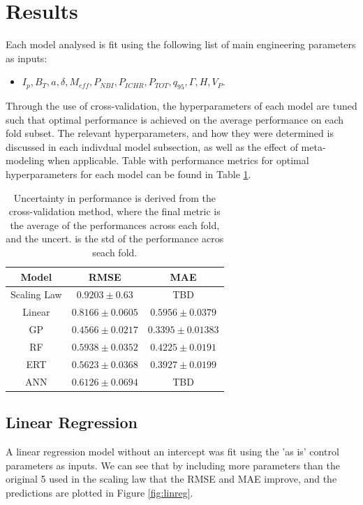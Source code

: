 \documentclass[a4paper, twoside, final, 12pt]{article}
\begin{document}
\section{Results}{\label{sec:results_1}
Each model analysed is fit using the following list of main engineering parameters as inputs:
\begin{itemize}
        \item $I_p, B_T, a, \delta, M_{eff}, P_{NBI}, P_{ICHR}, P_{TOT}, q_{95}, \Gamma, H, V_P$.
\end{itemize}
Through the use of cross-validation, the hyperparameters of each model are tuned such that optimal performance is achieved on the average performance on each fold subset.
The relevant hyperparameters, and how they were determined is discussed in each indivdual model subsection, as well as the effect of meta-modeling when applicable.
Table with performance metrics for optimal hyperparameters for each model can be found in Table \ref{tab:performance_models}.

\begin{table}
	\begin{center}
		\begin{tabular}{| c | c | c |}
		\hline
		Model & RMSE & MAE \\
		\hline
		Scaling Law & $0.9203 \pm 0.63$ & TBD \\
		\hline
		Linear & $0.8166 \pm 0.0605 $ & $0.5956 \pm 0.0379$ \\
		GP & $0.4566 \pm  0.0217$ &  $0.3395 \pm 0.01383$\\
		RF & $0.5938 \pm 0.0352$ & $0.4225 \pm 0.0191$ \\
		ERT &$0.5623 \pm 0.0368 $ & $0.3927 \pm 0.0199$ \\
		ANN & $0.6126 \pm 0.0694$ & TBD \\
		\hline
		\end{tabular}
		\caption{Uncertainty in performance is derived from the cross-validation method, where the final metric is the average of the performances across each fold, and the uncert. is the std of the performance acros seach fold.}
		\label{tab:performance_models}
	\end{center}
\end{table}

\subsection{Linear Regression}
A linear regression model without an intercept was fit using the 'as is' control parameters as inputs.
We can see that by including more parameters than the original 5 used in the scaling law that the RMSE and MAE improve, and the predictions are plotted in Figure \ref{fig:linreg}.


}
\end{document}
